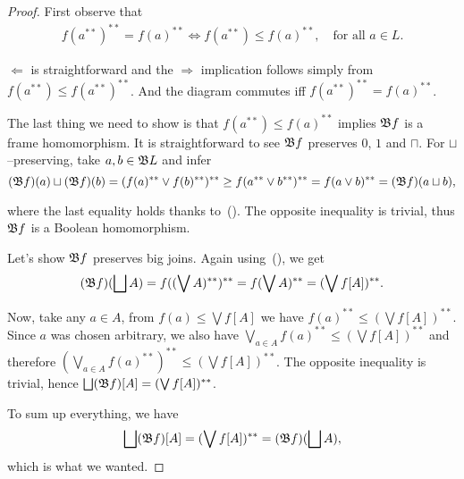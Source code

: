 \begin{proof}
    First observe that
    \begin{align}
        f(a^{**})^{**} = f(a)^{**} \iff f(a^{**}) \leq f(a)^{**},\quad\text{for all } a\in L.\label{e:2202iff20leq02}\tag{W.O.}
    \end{align}

    $\Leftarrow$ is straightforward and the $\Rightarrow$ implication follows simply from $f(a^{**}) \leq f(a^{**})^{**} $. And the diagram commutes iff $f(a^{**})^{**} = f(a)^{**}$.

    The last thing we need to show is that $f(a^{**}) \leq f(a)^{**}$ implies $\mathfrak{B} f$ is a frame homomorphism. It is straightforward to see $\mathfrak{B} f$ preserves $0$, $1$ and $\sqcap$. For $\sqcup$--preserving, take $a, b \in \mathfrak{B} L$ and infer
    $$(\mathfrak{B} f)(a)\sqcup (\mathfrak{B} f)(b) = (f(a)^{**}\vee f(b)^{**})^{**} \geq f(a^{**}\vee b^{**})^{**} = f(a\vee b)^{**} = (\mathfrak{B} f)(a\sqcup b),$$

    \noindent where the last equality holds thanks to~(). The opposite inequality is trivial, thus $\mathfrak{B} f$ is a Boolean homomorphism.

    Let's show $\mathfrak{B} f$ preserves big joins. Again using~(), we get
    $$ (\mathfrak{B} f)(\bigsqcup A) = f((\bigvee A)^{**})^{**} = f(\bigvee A)^{**} = (\bigvee f[A])^{**}. $$

    Now, take any $a\in A$, from $f(a) \leq \bigvee f[A]$ we have $f(a)^{**} \leq (\bigvee f[A])^{**}$. Since $a$ was chosen arbitrary, we also have $\bigvee_{a\in A} f(a)^{**} \leq (\bigvee f[A])^{**}$ and therefore $(\bigvee_{a\in A} f(a)^{**})^{**} \leq (\bigvee f[A])^{**}$. The opposite inequality is trivial, hence $\bigsqcup (\mathfrak{B} f)[A] = (\bigvee f[A])^{**}$.

    To sum up everything, we have
    $$ \bigsqcup (\mathfrak{B} f)[A] = (\bigvee f[A])^{**} = (\mathfrak{B} f)(\bigsqcup A),$$
    \noindent which is what we wanted.
\end{proof}

